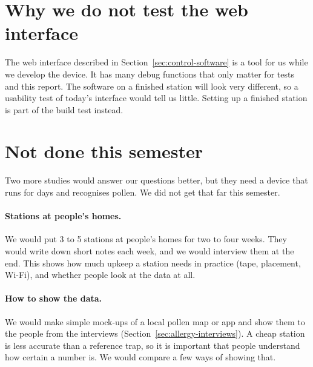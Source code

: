 \section{Why we do not test the web interface}\label{sec:no-ui-test}

The web interface described in Section~\ref{sec:control-software} is a tool for us while we
develop the device. It has many debug functions that only matter for tests and this report. The
software on a finished station will look very different, so a usability test of today's
interface would tell us little. Setting up a finished station is part of the build test instead.

\section{Not done this semester}\label{sec:not-done-users}

Two more studies would answer our questions better, but they need a device that runs for days
and recognises pollen. We did not get that far this semester.

\paragraph{Stations at people's homes.} We would put 3 to 5 stations at people's homes for two to
four weeks. They would write down short notes each week, and we would interview them at the end.
This shows how much upkeep a station needs in practice (tape, placement, Wi-Fi), and whether
people look at the data at all.

\paragraph{How to show the data.} We would make simple mock-ups of a local pollen map or app and
show them to the people from the interviews (Section~\ref{sec:allergy-interviews}). A cheap
station is less accurate than a reference trap, so it is important that people understand how
certain a number is. We would compare a few ways of showing that.
